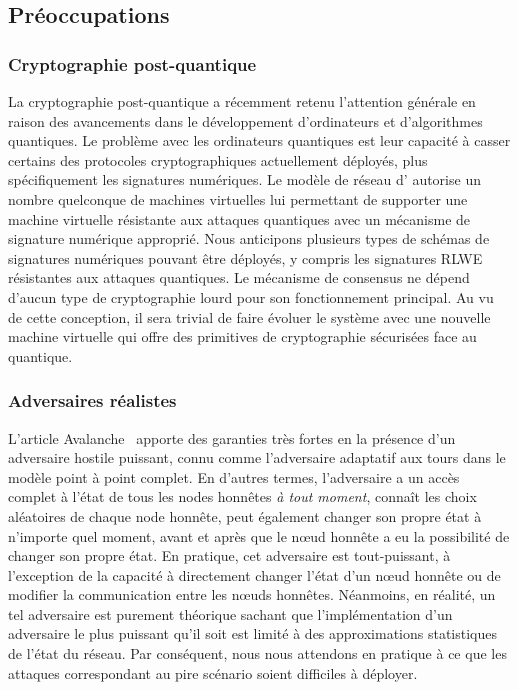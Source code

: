 \documentclass[runningheads,francais,a4paper]{llncs}
\begin{document}
\subsection{Préoccupations}
\subsubsection{Cryptographie post-quantique}
La cryptographie post-quantique a récemment retenu l'attention générale en raison des avancements dans le développement
d'ordinateurs et d'algorithmes quantiques. Le problème avec les ordinateurs quantiques est leur capacité à casser
certains des protocoles cryptographiques actuellement déployés, plus spécifiquement les signatures numériques. Le modèle
de réseau d'\AVAPlatformName{} autorise un nombre quelconque de machines virtuelles lui permettant de supporter une
machine virtuelle résistante aux attaques quantiques avec un mécanisme de signature numérique approprié. Nous
anticipons plusieurs types de schémas de signatures numériques pouvant être déployés, y compris les signatures RLWE
résistantes aux attaques quantiques. Le mécanisme de consensus ne dépend d'aucun type de cryptographie lourd pour son
fonctionnement principal. Au vu de cette conception, il sera trivial de faire évoluer le système avec une nouvelle
machine virtuelle qui offre des primitives de cryptographie sécurisées face au quantique.

\subsubsection{Adversaires réalistes}
L'article Avalanche~\cite{avalanche} apporte des garanties très fortes en la présence d'un adversaire hostile puissant,
connu comme l'adversaire adaptatif aux tours dans le modèle point à point complet. En d'autres termes, l'adversaire a un
accès complet à l'état de tous les nodes honnêtes \emph{à tout moment}, connaît les choix aléatoires de chaque node
honnête, peut également changer son propre état à n'importe quel moment, avant et après que le nœud honnête a eu la
possibilité de changer son propre état. En pratique, cet adversaire est tout-puissant, à l'exception de la capacité à
directement changer l'état d'un nœud honnête ou de modifier la communication entre les nœuds honnêtes. Néanmoins, en
réalité, un tel adversaire est purement théorique sachant que l'implémentation d'un adversaire le plus puissant qu'il
soit est limité à des approximations statistiques de l'état du réseau. Par conséquent, nous nous attendons en pratique
à ce que les attaques correspondant au pire scénario soient difficiles à déployer.
\end{document}
